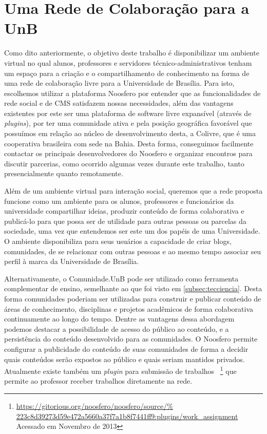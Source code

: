 \chapter{Uma Rede de Colaboração para a UnB}

Como dito anteriormente, o objetivo deste trabalho é disponibilizar um ambiente
virtual no qual alunos, professores e servidores técnico-administrativos tenham 
um espaço para a criação e o compartilhamento de conhecimento na forma de uma
rede de colaboração livre para a Universidade de Brasília.
%
Para isto, escolhemos utilizar a plataforma Noosfero por entender que
as funcionalidades de rede social e de CMS satisfazem nossas necessidades, além
das vantagens existentes por este ser uma plataforma de software
livre expansível (através de \textit{plugins}), por ter uma comunidade
ativa e pela posição geográfica favorável que possuímos em relação ao núcleo de
desenvolvimento desta, a Colivre, que é uma cooperativa brasileira com sede na
Bahia.
%
Desta forma, conseguimos facilmente contactar os principais desenvolvedores
do Noosfero e organizar encontros para discutir parcerias, como ocorrido
algumas vezes durante este trabalho, tanto presencialmente quanto remotamente.

Além de um ambiente virtual para interação social, queremos que a rede proposta
funcione como um ambiente para os alunos, professores e funcionários da
universidade compartilhar ideias, produzir conteúdo de forma colaborativa e
publicá-lo para que possa ser de utilidade para outras pessoas ou parcelas da
sociedade, uma vez que entendemos ser este um dos papéis de uma Universidade.
%
O ambiente disponibiliza para seus usuários a capacidade de criar blogs,
comunidades, de se relacionar com outras pessoas e ao mesmo tempo associar seu
perfil à marca da Universidade de Brasília.

Alternativamente, o Comunidade.UnB pode ser utilizado como ferramenta
complementar de ensino, semelhante ao que foi visto em \ref{subsec:tecciencia}.
%
Desta forma comunidades poderiam ser utilizadas para construir e publicar
conteúdo de áreas de conhecimento, disciplinas e projetos acadêmicos de forma
colaborativa continuamente ao longo do tempo. Dentre as vantagens dessa
abordagem podemos destacar a possibilidade de acesso do público ao conteúdo, e a
persistência do conteúdo desenvolvido para as comunidades. O Noosfero permite
configurar a publicidade do conteúdo de suas comunidades de forma a decidir
quais conteúdos serão expostos ao público e quais seriam mantidos privados.
%
Atualmente existe também um \textit{plugin} para submissão de trabalhos
~\footnote{\url{https://gitorious.org/noosfero/noosfero/source/%
223c8d39273d59e472a5660a37f7a1b8f7441ff9:plugins/work_assignment}
Acessado em Novembro de 2013} que permite ao professor receber trabalhos diretamente
na rede.

